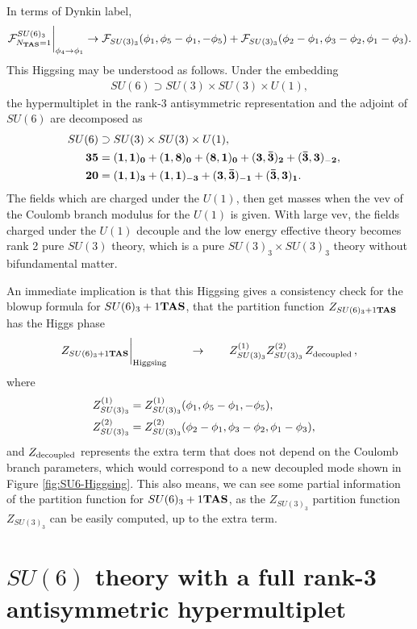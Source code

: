 \documentclass[11pt,a4paper]{article}
\begin{document}
In terms of Dynkin label,
\begin{align}
\mathcal{F}^{SU(6)_{3}}_{N_{{\bf TAS}}=1}{}\bigg|_{\phi_4\to\phi_1}	\rightarrow \mathcal{F}_{SU(3)_{3}} (\phi_1, \phi_5-\phi_1,-\phi_5) + \mathcal{F}_{SU(3)_{3}} (\phi_2-\phi_1, \phi_3-\phi_2,\phi_1-\phi_3).
\end{align}
This Higgsing may be understood as follows. Under the embedding
\begin{align}
	SU(6) \supset SU(3) \times SU(3) \times U(1),
\end{align}
the hypermultiplet in the rank-3 antisymmetric representation and the adjoint of $SU(6)$ are decomposed as
\begin{align}
	SU(6) &\supset SU(3) \times  SU(3) \times U(1),\crcr
	{\bf 35 }& ={\bf (1,1)_0 + (1,8)_0 + (8,1)_0 + (3,\bar3)_2 +(\bar3, 3)_{-2}},\crcr
	{\bf 20}&={\bf (1,1)_3 + (1,1)_{-3}+ (3,\bar3)_{-1}+(\bar3, 3)_{1} 
	}.	
\end{align}
The fields which are charged under the $U(1)$, then get masses when the vev of the Coulomb branch modulus for the $U(1)$ is given. With large vev, the fields charged under the $U(1)$ decouple and the low energy effective theory becomes rank 2 pure $SU(3)$ theory, which is a pure $SU(3)_3\times SU(3)_3$ theory without bifundamental matter.



An immediate implication is that this Higgsing gives a consistency check for the blowup formula for $SU(6)_{3}+1{\bf TAS}$, that the partition function $Z_{SU(6)_{3}+1{\bf TAS}}$ has the Higgs phase
\begin{align}
Z_{SU(6)_{3}+1{\bf TAS}}\bigg|_{\rm Higgsing}\qquad \rightarrow\qquad Z^{(1)}_{SU(3)_{3}}Z^{(2)}_{SU(3)_{3}}\,Z^{}_{\rm decoupled}\,,	
\end{align}
where 
\begin{align}
	Z^{(1)}_{SU(3)_{3}} &= Z^{(1)}_{SU(3)_{3}} (\phi_1, \phi_5-\phi_1,-\phi_5),\crcr
	Z^{(2)}_{SU(3)_{3}} &= 	Z^{(2)}_{SU(3)_{3}}(\phi_2-\phi_1, \phi_3-\phi_2,\phi_1-\phi_3), 
\end{align}
and $Z_{\rm decoupled}$ represents the extra term that does not depend on the Coulomb branch parameters, which would correspond to a new decoupled mode shown in Figure \ref{fig:SU6-Higgsing}. 
This also means, we can see some partial information of the partition function for $SU(6)_{3}+1{\bf TAS}$, as the $Z_{SU(3)_{3}}$ partition function $Z_{SU(3)_{3}}$ can be easily computed, up to the extra term. 
\section{$SU(6)$ theory with a full rank-3 antisymmetric hypermultiplet}
\end{document}
